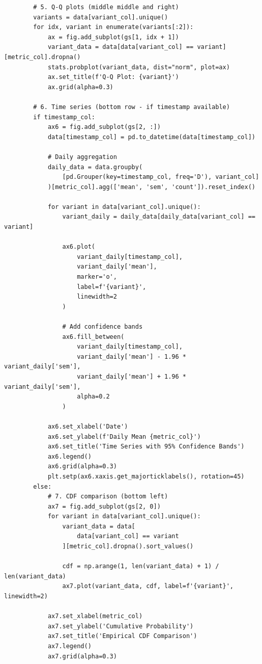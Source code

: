 \begin{lstlisting}
        # 5. Q-Q plots (middle middle and right)
        variants = data[variant_col].unique()
        for idx, variant in enumerate(variants[:2]):
            ax = fig.add_subplot(gs[1, idx + 1])
            variant_data = data[data[variant_col] == variant][metric_col].dropna()
            stats.probplot(variant_data, dist="norm", plot=ax)
            ax.set_title(f'Q-Q Plot: {variant}')
            ax.grid(alpha=0.3)

        # 6. Time series (bottom row - if timestamp available)
        if timestamp_col:
            ax6 = fig.add_subplot(gs[2, :])
            data[timestamp_col] = pd.to_datetime(data[timestamp_col])

            # Daily aggregation
            daily_data = data.groupby(
                [pd.Grouper(key=timestamp_col, freq='D'), variant_col]
            )[metric_col].agg(['mean', 'sem', 'count']).reset_index()

            for variant in data[variant_col].unique():
                variant_daily = daily_data[daily_data[variant_col] == variant]

                ax6.plot(
                    variant_daily[timestamp_col],
                    variant_daily['mean'],
                    marker='o',
                    label=f'{variant}',
                    linewidth=2
                )

                # Add confidence bands
                ax6.fill_between(
                    variant_daily[timestamp_col],
                    variant_daily['mean'] - 1.96 * variant_daily['sem'],
                    variant_daily['mean'] + 1.96 * variant_daily['sem'],
                    alpha=0.2
                )

            ax6.set_xlabel('Date')
            ax6.set_ylabel(f'Daily Mean {metric_col}')
            ax6.set_title('Time Series with 95% Confidence Bands')
            ax6.legend()
            ax6.grid(alpha=0.3)
            plt.setp(ax6.xaxis.get_majorticklabels(), rotation=45)
        else:
            # 7. CDF comparison (bottom left)
            ax7 = fig.add_subplot(gs[2, 0])
            for variant in data[variant_col].unique():
                variant_data = data[
                    data[variant_col] == variant
                ][metric_col].dropna().sort_values()

                cdf = np.arange(1, len(variant_data) + 1) / len(variant_data)
                ax7.plot(variant_data, cdf, label=f'{variant}', linewidth=2)

            ax7.set_xlabel(metric_col)
            ax7.set_ylabel('Cumulative Probability')
            ax7.set_title('Empirical CDF Comparison')
            ax7.legend()
            ax7.grid(alpha=0.3)


\end{lstlisting}
